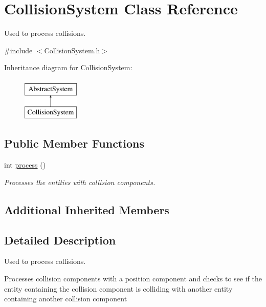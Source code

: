 \hypertarget{class_collision_system}{\section{Collision\-System Class Reference}
\label{da/d3c/class_collision_system}
}


Used to process collisions.  




{\ttfamily \#include $<$Collision\-System.\-h$>$}

Inheritance diagram for Collision\-System\-:\begin{figure}[H]
\begin{center}
\leavevmode
\includegraphics[height=2.000000cm]{da/d3c/class_collision_system}
\end{center}
\end{figure}
\subsection*{Public Member Functions}
\begin{DoxyCompactItemize}
\item 
int \hyperlink{class_collision_system_a8172916254667a746b257c38f04018d8}{process} ()
\begin{DoxyCompactList}\small\item\em Processes the entities with collision components. \end{DoxyCompactList}\end{DoxyCompactItemize}
\subsection*{Additional Inherited Members}


\subsection{Detailed Description}
Used to process collisions. 

Processes collision components with a position component and checks to see if the entity containing the collision component is colliding with another entity containing another collision component

